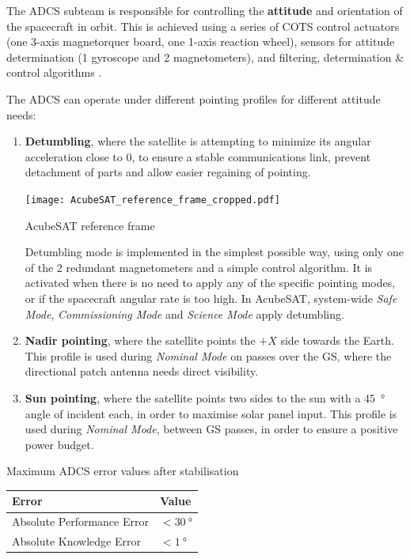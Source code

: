 \documentclass[a4paper,nobib]{tufte-book}
\begin{document}
The \ac{ADCS} subteam is responsible for controlling the \textbf{attitude} and orientation of the spacecraft in orbit. This is achieved using a series of \ac{COTS} control actuators (one 3-axis magnetorquer board, one 1-axis reaction wheel), sensors for attitude determination (1 gyroscope and 2 magnetometers), and filtering, determination \& control algorithms \autocite{DDJF_AOCS}.

The \ac{ADCS} can operate under different pointing profiles for different attitude needs:
\begin{enumerate}
	\item \textbf{Detumbling}, where the satellite is attempting to minimize its angular acceleration close to 0, to ensure a stable communications link, prevent detachment of parts and allow easier regaining of pointing.
	
	\begin{marginfigure}
		\centering
		\texttt{[image: AcubeSAT\_reference\_frame\_cropped.pdf]}
		\caption{AcubeSAT reference frame}
		\label{fig:frame}
	\end{marginfigure}
	
	Detumbling mode is implemented in the simplest possible way, using only one of the 2 redundant magnetometers and a simple control algorithm. It is activated when there is no need to apply any of the specific pointing modes, or if the spacecraft angular rate is too high. In AcubeSAT, system-wide \emph{Safe Mode}, \emph{Commissioning Mode} and \emph{Science Mode} apply detumbling.
	
	\item \textbf{Nadir pointing}, where the satellite points the \(+X\) side towards the Earth. This profile is used during \emph{Nominal Mode} on passes over the \acl{GS}, where the directional patch antenna needs direct visibility.
	
	\item \textbf{Sun pointing}, where the satellite points two sides to the sun with a \SI{45}{\degree} angle of incident each, in order to maximise solar panel input. This profile is used during \emph{Nominal Mode}, between \ac{GS} passes, in order to ensure a positive power budget.
\end{enumerate}

\begin{margintable}
	\centering
	\caption[Maximum ADCS error values after stabilisation]{Maximum \ac{ADCS} error values after stabilisation}
	\label{tab:adcsape}
	\begin{tabular}{@{}ll@{}}
		\toprule
		Error                      & Value                    \\ \midrule
		Absolute Performance Error & \( < \SI{30}{\degree} \) \\
		Absolute Knowledge Error   & \( < \SI{1}{\degree} \) 
	\end{tabular}
\end{margintable}
\end{document}

